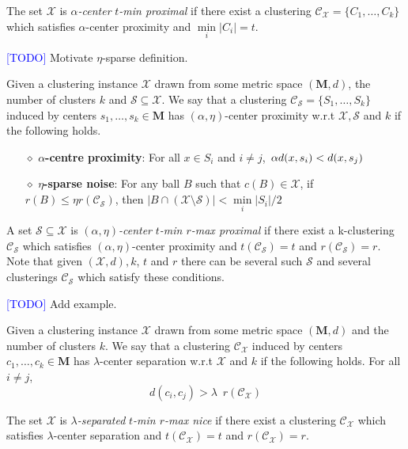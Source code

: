 \documentclass[anon,12pt]{colt2016} %
\newcommand{\mc}{\mathcal}
\newcommand{\mb}{\mathbf}
\newcommand{\todo}{\textcolor{blue}{[TODO]}\xspace}
\begin{document}
\noindent The set $\mc X$ is {\it $\alpha$-center} {\it $t$-min proximal} if there exist a clustering $\mc C_{\mc X}=\{C_1,\ldots,C_k\}$ which satisfies $\alpha$-center proximity and $\min\limits_{i} \lvert C_i\rvert = t$. 

\todo Motivate $\eta$-sparse definition.

\begin{definition}
Given a clustering instance $\mc X$ drawn from some metric space $(\mb M, d)$, the number of clusters $k$ and $\mc S \subseteq \mc X$. We say that a clustering $\mc C_{\mc S} = \{S_1, \ldots, S_k\}$ induced by centers $s_1, \ldots, s_k \in \mb M$ has $(\alpha, \eta)$-center proximity w.r.t $\mc X, \mc S$ and $k$ if the following holds.

\begin{itemize}[nolistsep, noitemsep]
\label{defn:alphacpnoise}	

\item[$\diamond$] {\bf $\alpha$-centre proximity}: For all $x \in S_i$ and $i\neq j$, $\thinspace\alpha d(x, s_i) < d(x, s_j)$
\item[$\diamond$]{\bf $\eta$-sparse noise}: For any ball $B$ such that $c(B)\in \mathcal{X}$, if $r(B)\leq \eta r(\mc{C}_{\mc S})$, then $|B\cap (\mc X\setminus \mc S)| < \min\limits_{i} |S_i|/2$
\end{itemize}
\end{definition}

\noindent A set $\mc S \subseteq \mc X$ is {\it $(\alpha, \eta)$-center} {\it $t$-min $r$-max proximal} if there exist a k-clustering $\mc C_{\mc S}$ which satisfies $(\alpha, \eta)$-center proximity and $t(\mc{C}_{\mc{S}}) = t$ and $r(\mc{C}_{\mc{S}}) = r$. Note that given $(\mc X, d), k$, $t$ and $r$ there can be several such $\mc S$ and several clusterings $\mc C_{\mc S}$ which satisfy these conditions.

\todo Add example.

\begin{definition}
\label{defn:lambdacs}
Given a clustering instance $\mc X$ drawn from some metric space $(\mb M, d)$ and the number of clusters $k$. We say that a clustering $\mc C_{\mc X}$ induced by centers $c_1, \ldots, c_k \in \mb M$ has $\lambda$-center separation w.r.t $\mc X$ and $k$ if the following holds. For all $i\neq j$, 
$$d(c_i, c_j) > \lambda \enspace r(\mc{C}_{\mc{X}})$$
\end{definition}

\noindent The set $\mc X$ is {\it $\lambda$-separated} {\it $t$-min $r$-max nice} if there exist a clustering $\mc C_{\mc X}$ which satisfies $\lambda$-center separation and $t(\mc{C}_{\mc{X}}) = t$ and $r(\mc{C}_\mc{X}) = r$.
\end{document}
